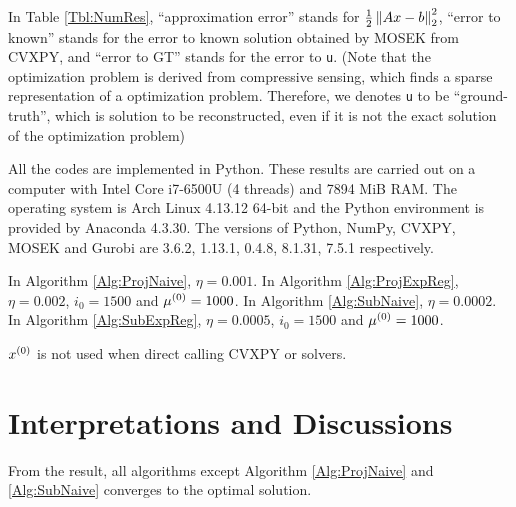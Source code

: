 \documentclass[english]{pkupaper}
\begin{document}
In Table \ref{Tbl:NumRes}, ``approximation error'' stands for $ \frac{1}{2} \left\|  A x - b  \right\|_2^2 $, ``error to known'' stands for the error to known solution obtained by MOSEK from CVXPY, and ``error to GT'' stands for the error to \verb"u". (Note that the optimization problem is derived from compressive sensing, which finds a sparse representation of a optimization problem. Therefore, we denotes \verb"u" to be ``ground-truth'', which is solution to be reconstructed, even if it is not the exact solution of the optimization problem)

All the codes are implemented in Python. These results are carried out on a computer with Intel Core i7-6500U (4 threads) and 7894 MiB RAM. The operating system is Arch Linux 4.13.12 64-bit and the Python environment is provided by Anaconda 4.3.30. The versions of Python, NumPy, CVXPY, MOSEK and Gurobi are 3.6.2, 1.13.1, 0.4.8, 8.1.31, 7.5.1 respectively.

In Algorithm \ref{Alg:ProjNaive}, $ \eta = 0.001 $. In Algorithm \ref{Alg:ProjExpReg}, $ \eta = 0.002 $, $ i_0 = 1500 $ and $ \mu^{\left( 0 \right)} = 1000 $. In Algorithm \ref{Alg:SubNaive}, $ \eta = 0.0002 $. In Algorithm \ref{Alg:SubExpReg}, $ \eta = 0.0005 $, $ i_0 = 1500 $ and $ \mu^{\left( 0 \right)} = 1000 $.

$x^{\left( 0 \right)}$ is not used when direct calling CVXPY or solvers.

\section{Interpretations and Discussions}

From the result, all algorithms except Algorithm \ref{Alg:ProjNaive} and \ref{Alg:SubNaive} converges to the optimal solution.
\end{document}
